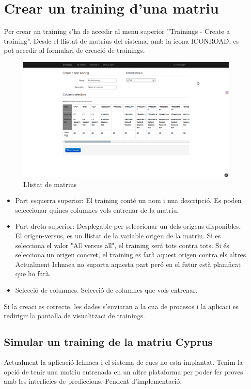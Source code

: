 \section{Crear un training d'una matriu}
Per crear un training s'ha de accedir al menu superior ''Trainings - Create a training''. Desde el llistat de matrius del sistema, amb la icona ICONROAD, es pot accedir al formulari de creaci\'{o} de trainings.
\begin{figure}[h!]
  \centering
  \includegraphics[scale=0.2]{img/userguide/training_create.png}
  \caption{Llistat de matrius}
  \label{fig:placement}
\end{figure}
\begin{itemize}
\item Part esquerra superior: El training cont\'{e} un nom i una descripci\'{o}. Es poden seleccionar quines columnes vols entrenar de la matriu. 
\item Part dreta superior: Desplegable per seleccionar un dels origens disponibles.  El origen-versus, es un llistat de la variable origen de la matriu. Si es selecciona el valor "All versus all", el training ser\'{a} tots contra tots. Si \'{e}s selecciona un origen concret, el training es far\`{a} aquest origen contra els altres. Actualment Ichnaea no suporta aquesta part per\'{o} en el futur est\`{a} planificat que ho far\`{a}.
\item Selecci\'{o} de columnes. Selecci\'{o} de columnes que vols entrenar.
\end{itemize}

Si la creaci \´e{s} correcte, les dades s'enviaran a la cua de procesos i la aplicaci es redirigir la pantalla de visualitzaci de trainings.

\subsection{Simular un training de la matriu Cyprus}
Actualment la aplicaci\'{o} Ichnaea i el sistema de cues no esta implantat. Tenim la opci\'{o} de tenir una matriu entrenada en un altre plataforma per poder fer proves amb les interficies de prediccions. Pendent d'implementaci\'{o}.

